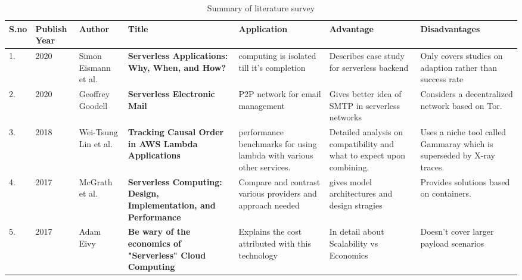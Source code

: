 \begin{table}[H]

\begin{tabular}{|p{1.2em}|p{2.6em}|p{3.0em}|p{7.5em}|p{6em}|p{4.5em}|p{5.5em}|} 
\hline
S.no & Publish Year & Author & Title & Application & Advantage & Disadvantages \\
\hline
1. & 2020 &Simon Eismann et al.&\textbf{Serverless Applications:
Why, When, and How? } & computing is isolated till it's completion &Describes case study for serverless backend& Only covers studies on adaption rather than success rate\\ 
\hline
2. & 2020 &Geoffrey Goodell&\textbf{Serverless Electronic Mail } & P2P network for email management & Gives better idea of SMTP in serverless networks &Considers a decentralized network based on Tor.\\ 
\hline
3. & 2018& Wei-Tsung Lin et al.&\textbf{Tracking Causal Order in AWS Lambda Applications}&  performance benchmarks for using lambda with various other services.& Detailed analysis on compatibility and what to expect upon combining.& Uses a niche tool called Gammaray which is superseded by X-ray traces.\\ 
\hline

4. & 2017& McGrath et al.  & \textbf{Serverless Computing: Design, Implementation, and Performance} &  Compare and contrast various providers and approach needed & gives model architectures and design stragies  & Provides solutions based on containers.\\ 
\hline
5. & 2017 & Adam Eivy & \textbf{Be wary of the economics of "Serverless" Cloud Computing} & Explains the cost attributed with this technology & In detail about Scalability vs Economics & Doesn't cover larger payload scenarios\\ 
\hline
\end{tabular}
\caption{Summary of literature survey}
\end{table}


